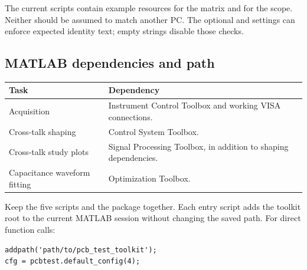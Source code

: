 The current scripts contain example resources  for the matrix and  for the scope. Neither should be assumed to match another PC. The optional  and  settings can enforce expected identity text; empty strings disable those checks.

\subsection{MATLAB dependencies and path}
\begin{tabularx}{\linewidth}{@{}lX@{}}
\toprule
Task & Dependency \\
\midrule
Acquisition & Instrument Control Toolbox and working VISA connections. \\
Cross-talk shaping & Control System Toolbox. \\
Cross-talk study plots & Signal Processing Toolbox, in addition to shaping dependencies. \\
Capacitance waveform fitting & Optimization Toolbox. \\
\bottomrule
\end{tabularx}

Keep the five  scripts and the  package together. Each entry script adds the toolkit root to the current MATLAB session without changing the saved path. For direct function calls:
\begin{lstlisting}
addpath('path/to/pcb_test_toolkit');
cfg = pcbtest.default_config(4);
\end{lstlisting}

